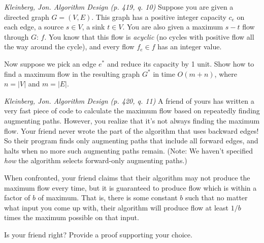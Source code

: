 \documentclass[solutionorbox,answers]{exam} %
\begin{document}
\begin{questions}

\newpage

\question
\emph{Kleinberg, Jon. Algorithm Design (p. 419, q. 10)}
Suppose you are given a directed graph $G=(V,E)$. This graph has a positive integer capacity $c_e$ on each edge, a source $s\in V$, a sink $t\in V$. You are also given a maximum $s-t$ flow through $G$: $f$. You know that this flow is \emph{acyclic} (no cycles with positive flow all the way around the cycle), and every flow $f_e\in f$ has an integer value.

Now suppose we pick an edge $e^*$ and reduce its capacity by 1 unit. Show how to find a maximum flow in the resulting graph $G^*$ in time $O(m+n)$, where $n=|V|$ and $m=|E|$.
\begin{solutionbox}{2in}


\end{solutionbox}

\question
\emph{Kleinberg, Jon. Algorithm Design (p. 420, q. 11)}
A friend of yours has written a very fast piece of code to calculate the maximum flow based on repeatedly finding augmenting paths. However, you realize that it's not always finding the maximum flow. Your friend never wrote the part of the algorithm that uses backward edges! So their program finds only augmenting paths that include all forward edges, and halts when no more such augmenting paths remain. (Note: We haven't specified \emph{how} the algorithm selects forward-only augmenting paths.)

When confronted, your friend claims that their algorithm may not produce the maximum flow every time, but it is guaranteed to produce flow which is within a factor of $b$ of maximum. That is, there is some constant $b$ such that no matter what input you come up with, their algorithm will produce flow at least $1/b$ times the maximum possible on that input.

Is your friend right? Provide a proof supporting your choice.
\begin{solutionbox}{3in}



\end{solutionbox}
\end{questions}
\end{document}
